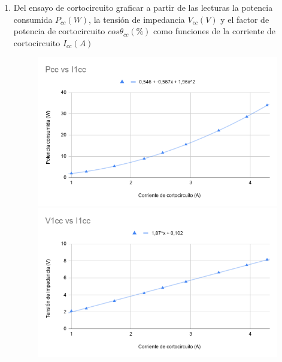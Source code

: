 \documentclass[12pt]{article}
\begin{document}
\begin{enumerate}
    \item Del ensayo de cortocircuito graficar a partir de las lecturas la potencia consumida $P_{cc}(W)$, la tensión de impedancia $V_{cc}(V)$ y el factor de potencia de cortocircuito $cos\theta_{cc}(\%)$ como funciones de la corriente de cortocircuito $I_{cc}(A)$
    \begin{figure}[H]
    \centering
        \begin{minipage}{.5\textwidth}
          \centering
          \includegraphics[width=1.0\linewidth]{PccvsI1cc.png}
          \captionsetup{labelformat=empty}
        \end{minipage}%
        \begin{minipage}{.5\textwidth}
          \centering
          \includegraphics[width=1.0\linewidth]{V1ccvsI1cc.png}
          \captionsetup{labelformat=empty}
        \end{minipage}
    \end{figure}
    

\end{enumerate}
\end{document}
